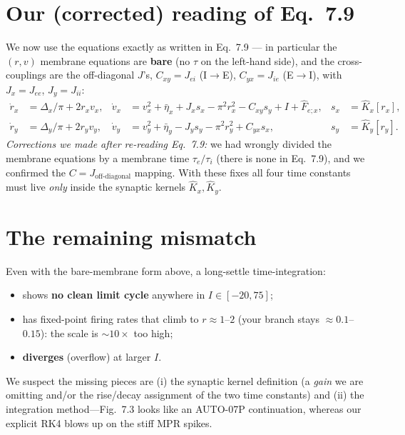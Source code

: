 \documentclass[11pt,a4paper]{article}
\newcommand{\rd}{\dot r}
\newcommand{\vd}{\dot v}
\begin{document}
\section{Our (corrected) reading of Eq.~7.9}
We now use the equations exactly as written in Eq.~7.9 --- in particular the $(r,v)$
membrane equations are \textbf{bare} (no $\tau$ on the left-hand side), and the
cross-couplings are the off-diagonal $J$'s, $C_{xy}=J_{ei}$ (I$\to$E), $C_{yx}=J_{ie}$
(E$\to$I), with $J_x=J_{ee}$, $J_y=J_{ii}$:
\begin{align*}
\rd_x &= \Delta_x/\pi + 2 r_x v_x, &
\vd_x &= v_x^2 + \bar\eta_x + J_x s_x - \pi^2 r_x^2 - C_{xy} s_y + I + \hat F_{e;x}, &
s_x &= \hat K_x[r_x],\\
\rd_y &= \Delta_y/\pi + 2 r_y v_y, &
\vd_y &= v_y^2 + \bar\eta_y - J_y s_y - \pi^2 r_y^2 + C_{yx} s_x, &
s_y &= \hat K_y[r_y].
\end{align*}
\emph{Corrections we made after re-reading Eq.~7.9:} we had wrongly divided the membrane
equations by a membrane time $\tau_e/\tau_i$ (there is none in Eq.~7.9), and we confirmed
the $C=J_{\text{off-diagonal}}$ mapping. With these fixes all four time constants must
live \emph{only} inside the synaptic kernels $\hat K_x,\hat K_y$.

\section{The remaining mismatch}
Even with the bare-membrane form above, a long-settle time-integration:
\begin{itemize}
\item shows \textbf{no clean limit cycle} anywhere in $I\in[-20,75]$;
\item has fixed-point firing rates that climb to $r\approx1$--$2$ (your branch stays
      $\approx0.1$--$0.15$): the scale is $\sim$$10\times$ too high;
\item \textbf{diverges} (overflow) at larger $I$.
\end{itemize}
We suspect the missing pieces are (i) the synaptic kernel definition (a \emph{gain} we are
omitting and/or the rise/decay assignment of the two time constants) and (ii) the
integration method---Fig.~7.3 looks like an AUTO-07P continuation, whereas our explicit
RK4 blows up on the stiff MPR spikes.
\end{document}
